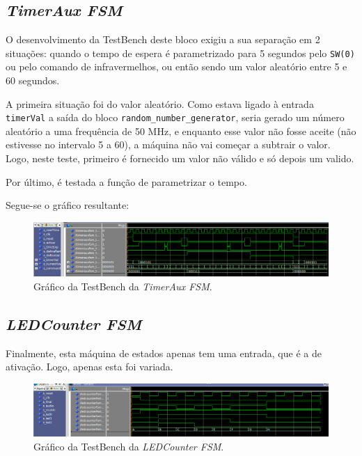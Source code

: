 \documentclass[a4paper,11pt,onecolumn]{report}
\begin{document}
\subsection{\textit{TimerAux FSM}}

O desenvolvimento da TestBench deste bloco exigiu a sua separação em 2 situações: quando o tempo de espera é parametrizado para 5 segundos pelo \texttt{SW(0)} ou pelo comando de infravermelhos, ou então sendo um valor aleatório entre 5 e 60 segundos.

A primeira situação foi do valor aleatório. Como estava ligado à entrada \texttt{timerVal} a saída do bloco \texttt{random\_number\_generator}, seria gerado um número aleatório a uma frequência de 50 MHz, e enquanto esse valor não fosse aceite (não estivesse no intervalo 5 a 60), a máquina não vai começar a subtrair o valor. Logo, neste teste, primeiro é fornecido um valor não válido e só depois um valido.

Por último, é testada a função de parametrizar o tempo.

Segue-se o gráfico resultante:

\begin{figure}[h]
\centerline{\includegraphics[scale=0.33]{Images/TimerAuxFSMTB}}
\caption{Gráfico da TestBench da \textit{TimerAux FSM}.}
\label{figtimerfsmtb}
\end{figure}

\subsection{\textit{LEDCounter FSM}}

Finalmente, esta máquina de estados apenas tem uma entrada, que é a de ativação. Logo, apenas esta foi variada.

\begin{figure}[h]
\centerline{\includegraphics[scale=0.33]{Images/LEDCounterFSMTB}}
\caption{Gráfico da TestBench da \textit{LEDCounter FSM}.}
\label{figledcounterfsmtb}
\end{figure}
\end{document}
